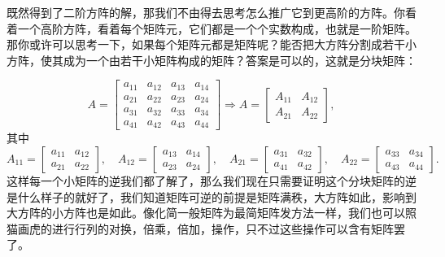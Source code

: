 \documentclass[UTF8]{ctexbook}
\begin{document}
既然得到了二阶方阵的解，那我们不由得去思考怎么推广它到更高阶的方阵。你看着一个高阶方阵，看着每个矩阵元，它们都是一个个实数构成，也就是一阶矩阵。那你或许可以思考一下，如果每个矩阵元都是矩阵呢？能否把大方阵分割成若干小方阵，使其成为一个由若干小矩阵构成的矩阵？答案是可以的，这就是分块矩阵：

\[
A=\begin{bmatrix}
a_{11}&a_{12}&a_{13}&a_{14}\\
a_{21}&a_{22}&a_{23}&a_{24}\\
a_{31}&a_{32}&a_{33}&a_{34}\\
a_{41}&a_{42}&a_{43}&a_{44}
\end{bmatrix}
\Longrightarrow
A=\begin{bmatrix}
A_{11}&A_{12}\\
A_{21}&A_{22}
\end{bmatrix},
\]
其中
\[
A_{11}=\begin{bmatrix}a_{11}&a_{12}\\a_{21}&a_{22}\end{bmatrix},\quad
A_{12}=\begin{bmatrix}a_{13}&a_{14}\\a_{23}&a_{24}\end{bmatrix},\quad
A_{21}=\begin{bmatrix}a_{31}&a_{32}\\a_{41}&a_{42}\end{bmatrix},\quad
A_{22}=\begin{bmatrix}a_{33}&a_{34}\\a_{43}&a_{44}\end{bmatrix}.
\]
这样每一个小矩阵的逆我们都了解了，那么我们现在只需要证明这个分块矩阵的逆是什么样子的就好了，我们知道矩阵可逆的前提是矩阵满秩，大方阵如此，影响到大方阵的小方阵也是如此。像化简一般矩阵为最简矩阵发方法一样，我们也可以照猫画虎的进行行列的对换，倍乘，倍加，操作，只不过这些操作可以含有矩阵罢了。
\end{document}
